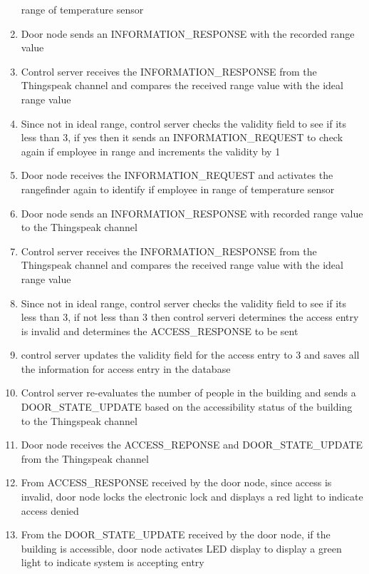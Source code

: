 \begin{enumerate}
          range of temperature sensor
    \item Door node sends an INFORMATION\_RESPONSE with the recorded range value
    \item Control server receives the INFORMATION\_RESPONSE from the Thingspeak
          channel and compares the received range value with the ideal range
          value
    \item Since not in ideal range, control server checks the validity field to
          see if its less than 3, if yes then it sends an INFORMATION\_REQUEST
          to check again if employee in range and increments the validity by 1 
    \item Door node receives the INFORMATION\_REQUEST and activates the
          rangefinder again to identify if employee in range of temperature
          sensor
    \item Door node sends an INFORMATION\_RESPONSE with recorded range value to
          the Thingspeak channel
    \item Control server receives the INFORMATION\_RESPONSE from the Thingspeak
          channel and compares the received range value with the ideal range
          value 
    \item Since not in ideal range, control server checks the validity field to
          see if its less than 3, if not less than 3 then control serveri
          determines the access entry is invalid and determines the
          ACCESS\_RESPONSE to be sent
    \item control server updates the validity field for the access entry to 3
          and saves all the information for access entry in the database
    \item Control server re-evaluates the number of people in the building and
          sends a DOOR\_STATE\_UPDATE based on the accessibility status of the
          building to the Thingspeak channel
    \item Door node receives the ACCESS\_REPONSE and DOOR\_STATE\_UPDATE from
          the Thingspeak channel
    \item From ACCESS\_RESPONSE received by the door node, since access is
          invalid, door node locks the electronic lock and displays a red light
          to indicate access denied 
    \item From the DOOR\_STATE\_UPDATE received by the door node, if the
          building is accessible, door node activates LED display to display a
          green light to indicate system is accepting entry
\end{enumerate}

